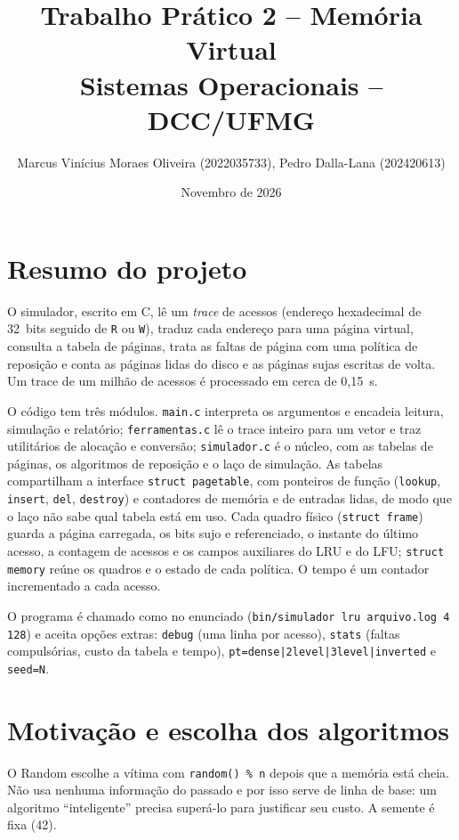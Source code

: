 \documentclass[11pt,a4paper]{article}
\title{Trabalho Prático 2 -- Memória Virtual\\[2pt]
       \large Sistemas Operacionais -- DCC/UFMG}
\author{Marcus Vinícius Moraes Oliveira (2022035733), Pedro Dalla-Lana (202420613)}
\date{Novembro de 2026}
\begin{document}
\maketitle

\section{Resumo do projeto}

O simulador, escrito em C, lê um \emph{trace} de acessos (endereço
hexadecimal de 32~bits seguido de \texttt{R} ou \texttt{W}), traduz cada
endereço para uma página virtual, consulta a tabela de páginas, trata
as faltas de página com uma política de reposição e conta as páginas
lidas do disco e as páginas sujas escritas de volta. Um trace de um
milhão de acessos é processado em cerca de 0,15~s.

O código tem três módulos. \texttt{main.c} interpreta os argumentos e
encadeia leitura, simulação e relatório; \texttt{ferramentas.c} lê o
trace inteiro para um vetor e traz utilitários de alocação e conversão;
\texttt{simulador.c} é o núcleo, com as tabelas de páginas, os
algoritmos de reposição e o laço de simulação. As tabelas compartilham a
interface \texttt{struct pagetable}, com ponteiros de função
(\texttt{lookup}, \texttt{insert}, \texttt{del}, \texttt{destroy}) e
contadores de memória e de entradas lidas, de modo que o laço não sabe
qual tabela está em uso. Cada quadro físico (\texttt{struct frame})
guarda a página carregada, os bits sujo e referenciado, o instante do
último acesso, a contagem de acessos e os campos auxiliares do LRU e do
LFU; \texttt{struct memory} reúne os quadros e o estado de cada
política. O tempo é um contador incrementado a cada acesso.

O programa é chamado como no enunciado
(\texttt{bin/simulador lru arquivo.log 4 128}) e aceita opções extras:
\texttt{debug} (uma linha por acesso), \texttt{stats} (faltas
compulsórias, custo da tabela e tempo), \texttt{pt=dense|2level|3level|inverted}
e \texttt{seed=N}.

\section{Motivação e escolha dos algoritmos}

O Random escolhe a vítima com \texttt{random() \% n} depois
que a memória está cheia. Não usa nenhuma informação do passado e por
isso serve de linha de base: um algoritmo ``inteligente'' precisa
superá-lo para justificar seu custo. A semente é fixa (42).
\end{document}
